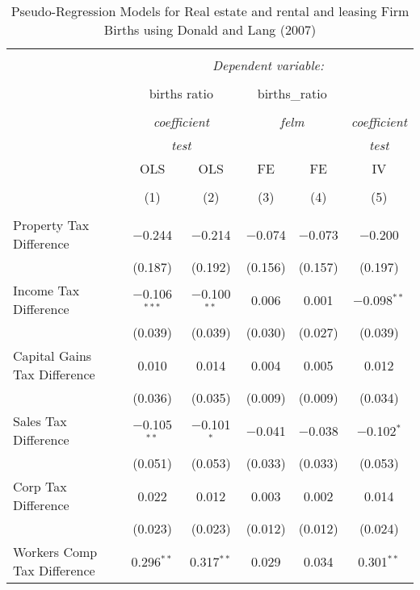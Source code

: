 
\begin{table}[!htbp] \centering 
  \caption{Pseudo-Regression Models for  Real estate and rental and leasing Firm Births using Donald and Lang (2007)} 
  \label{} 
\begin{tabular}{@{\extracolsep{5pt}}lccccc} 
\\[-1.8ex]\hline 
\hline \\[-1.8ex] 
 & \multicolumn{5}{c}{\textit{Dependent variable:}} \\ 
\cline{2-6} 
\\[-1.8ex] & \multicolumn{2}{c}{births ratio} & \multicolumn{2}{c}{births\_ratio} &   \\ 
\\[-1.8ex] & \multicolumn{2}{c}{\textit{coefficient}} & \multicolumn{2}{c}{\textit{felm}} & \textit{coefficient} \\ 
 & \multicolumn{2}{c}{\textit{test}} & \multicolumn{2}{c}{\textit{}} & \textit{test} \\ 
 & OLS & OLS & FE & FE & IV \\ 
\\[-1.8ex] & (1) & (2) & (3) & (4) & (5)\\ 
\hline \\[-1.8ex] 
 Property Tax Difference & $-$0.244 & $-$0.214 & $-$0.074 & $-$0.073 & $-$0.200 \\ 
  & (0.187) & (0.192) & (0.156) & (0.157) & (0.197) \\ 
  Income Tax Difference & $-$0.106$^{***}$ & $-$0.100$^{**}$ & 0.006 & 0.001 & $-$0.098$^{**}$ \\ 
  & (0.039) & (0.039) & (0.030) & (0.027) & (0.039) \\ 
  Capital Gains Tax Difference & 0.010 & 0.014 & 0.004 & 0.005 & 0.012 \\ 
  & (0.036) & (0.035) & (0.009) & (0.009) & (0.034) \\ 
  Sales Tax Difference & $-$0.105$^{**}$ & $-$0.101$^{*}$ & $-$0.041 & $-$0.038 & $-$0.102$^{*}$ \\ 
  & (0.051) & (0.053) & (0.033) & (0.033) & (0.053) \\ 
  Corp Tax Difference & 0.022 & 0.012 & 0.003 & 0.002 & 0.014 \\ 
  & (0.023) & (0.023) & (0.012) & (0.012) & (0.024) \\ 
  Workers Comp Tax Difference & 0.296$^{**}$ & 0.317$^{**}$ & 0.029 & 0.034 & 0.301$^{**}$ \\ 

\end{tabular}
\end{table}
